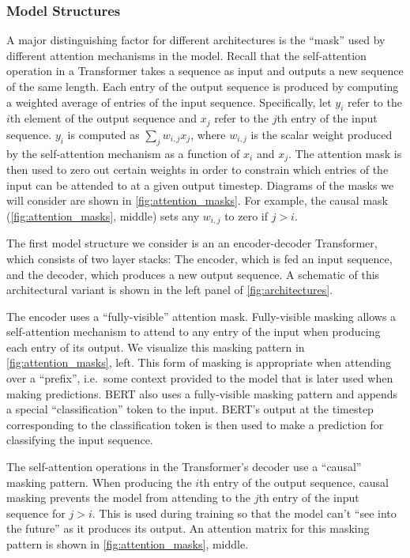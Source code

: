 \subsubsection{Model Structures}
\label{sec:structures}

A major distinguishing factor for different architectures is the ``mask'' used by different attention mechanisms in the model. Recall that the self-attention operation in a Transformer takes a sequence as input and outputs a new sequence of the same length. Each entry of the output sequence is produced by computing a weighted average of entries of the input sequence. Specifically, let $y_i$ refer to the $i$th element of the output sequence and $x_j$ refer to the $j$th entry of the input sequence. $y_i$ is computed as $\sum_j w_{i, j} x_j$, where $w_{i, j}$ is the scalar weight produced by the self-attention mechanism as a function of $x_i$ and $x_j$. The attention mask is then used to zero out certain weights in order to constrain which entries of the input can be attended to at a given output timestep. Diagrams of the masks we will consider are shown in \ref{fig:attention_masks}.
For example, the causal mask (\ref{fig:attention_masks}, middle) sets any $w_{i, j}$ to zero if $j > i$.

The first model structure we consider is an an encoder-decoder Transformer, which consists of two layer stacks: The encoder, which is fed an input sequence, and the decoder, which produces a new output sequence. A schematic of this architectural variant is shown in the left panel of \ref{fig:architectures}.

The encoder uses a ``fully-visible'' attention mask. Fully-visible masking allows a self-attention mechanism to attend to any entry of the input when producing each entry of its output. We visualize this masking pattern in \ref{fig:attention_masks}, left. This form of masking is appropriate when attending over a ``prefix'', i.e.\ some context provided to the model that is later used when making predictions. BERT \citep{devlin2018bert} also uses a fully-visible masking pattern and appends a special ``classification'' token to the input. BERT's output at the timestep corresponding to the classification token is then used to make a prediction for classifying the input sequence.

The self-attention operations in the Transformer's decoder use a ``causal'' masking pattern. When producing the $i$th entry of the output sequence, causal masking prevents the model from attending to the $j$th entry of the input sequence for $j > i$. This is used during training so that the model can't ``see into the future'' as it produces its output. An attention matrix for this masking pattern is shown in \ref{fig:attention_masks}, middle.

